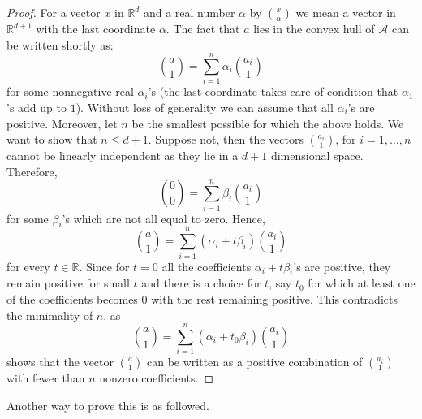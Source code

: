 \begin{proof}
    For a vector $x$ in $\mathbb{R}^{d}$ and a real number $\alpha$ by ${x \choose \alpha}$ we mean a vector in $\mathbb{R}^{d+1}$ with the last coordinate $\alpha$. The fact that $a$ lies in the convex hull of $\mathcal{A}$ can be written shortly as: 
    \begin{equation}
        {a\choose 1} = \sum^{n}_{i=1}\alpha_{i} {a_{i}\choose 1}
    \end{equation}
    for some nonnegative real $\alpha_{i}$'s (the last coordinate takes care of condition that $\alpha_{1}$'s add up to $1$). Without loss of generality we can assume that all $\alpha_{i}$'s are positive. Moreover, let $n$ be the smallest possible for which the above holds. We want to show that $n\leq d+ 1$. Suppose not, then the vectors ${a_{i}\choose 1}$, for $i=1,\dots,n$ cannot be linearly independent as they lie in a $d+1$ dimensional space. Therefore, 
\begin{equation}
    {0 \choose 0} = \sum^{n}_{i=1} \beta_{i} {a_{i}\choose 1}
\end{equation}
for some $\beta_{i}$'s which are not all equal to zero. Hence, 
\begin{equation}
    {a\choose 1} = \sum^{n}_{i=1} (\alpha_{i}+ t\beta_{i}) {a_{i}\choose 1}
\end{equation}
for every $t\in \mathbb{R}$. Since for $t=0$ all the coefficients $\alpha_{i}+t\beta_{i}$'s are positive, they remain positive for small $t$ and there is a choice for $t$, say $t_{0}$  for which at least one of the coefficients becomes $0$ with the rest remaining positive. This contradicts the minimality of $n$, as 
\begin{equation}
    {a\choose 1} = \sum^{n}_{i=1} (\alpha_{i} + t_{0}\beta_{i}) {a_{i}\choose 1}
\end{equation}
shows that the vector ${a\choose 1}$ can be written as a positive combination of ${a_{i}\choose 1}$ with fewer than $n$ nonzero coefficients. 
\end{proof}
Another way to prove this is as followed.
